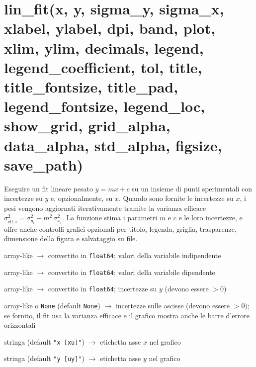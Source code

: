 \section{\texorpdfstring{lin\_fit(x, y, sigma\_y, sigma\_x, xlabel, ylabel, dpi, band, plot, xlim, ylim, decimals, legend, legend\_coefficient, tol, title, title\_fontsize, title\_pad, legend\_fontsize, legend\_loc, show\_grid, grid\_alpha, data\_alpha, std\_alpha, figsize, save\_path)}{lin\_fit(x, y, sigma\_y, sigma\_x, xlabel, ylabel, dpi, band, plot, xlim, ylim, decimals, legend, legend_coefficient, tol, title, title_fontsize, title_pad, legend_fontsize, legend_loc, show_grid, grid_alpha, data_alpha, std_alpha, figsize, save_path)}}
\label{sec:fit-lineare}
\vspace{-3pt}
\begin{apidesc}
  \item[\textbf{Scopo}]
    Eseguire un fit lineare pesato $y = mx + c$ su un insieme di punti sperimentali con incertezze su $y$ e, opzionalmente, su $x$. Quando sono fornite le incertezze su $x$, i pesi vengono aggiornati iterativamente tramite la varianza efficace $\sigma_{\mathrm{eff},i}^2 = \sigma_{y_i}^2 + m^2\,\sigma_{x_i}^2$. La funzione stima i parametri $m$ e $c$ e le loro incertezze, e offre anche controlli grafici opzionali per titolo, legenda, griglia, trasparenze, dimensione della figura e salvataggio su file.
    \enlargethispage{2\baselineskip}
  \item[\textbf{Parametri}]\hfill
    \begin{description}[font=\normalfont\ttfamily\bfseries, labelwidth=7em, leftmargin=7.5em, itemsep=1pt, parsep=0pt, topsep=3pt]
      \item[x]        array-like $\to$ convertito in \texttt{float64}; valori della variabile indipendente
      \item[y]        array-like $\to$ convertito in \texttt{float64}; valori della variabile dipendente
      \item[sigma\_y] array-like $\to$ convertito in \texttt{float64}; incertezze su $y$ (devono essere $> 0$)
      \item[sigma\_x] array-like o \texttt{None} (default \texttt{None}) $\to$ incertezze sulle ascisse (devono essere $> 0$); se fornito, il fit usa la varianza efficace e il grafico mostra anche le barre d'errore orizzontali
      \item[xlabel]   stringa (default \texttt{"x [xu]"}) $\to$ etichetta asse $x$ nel grafico
      \item[ylabel]   stringa (default \texttt{"y [uy]"}) $\to$ etichetta asse $y$ nel grafico

\end{description}
\end{apidesc}
